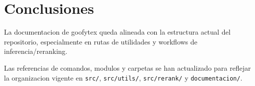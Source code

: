 \section{Conclusiones}

La documentacion de goofytex queda alineada con la estructura actual del repositorio, especialmente en rutas de utilidades y workflows de inferencia/reranking.

Las referencias de comandos, modulos y carpetas se han actualizado para reflejar la organizacion vigente en \texttt{src/}, \texttt{src/utils/}, \texttt{src/rerank/} y \texttt{documentacion/}.
